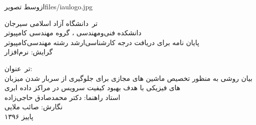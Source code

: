 
‌ازوسط
‌تصویر{files/iaulogo.jpg}


‌تر{\
	دانشگاه آزاد اسلامی سیرجان\\
دانشکده فنی‌ومهندسی ، گروه مهندسی کامپیوتر  \\
پایان نامه برای دریافت درجه کارشناسی‌ارشد رشته مهندسی‌کامپیوتر\
\\
گرایش: نرم‌افزار }


‌تر{\
	عنوان:\\
	بیان روشی به منظور تخصیص ماشین های مجازی برای جلوگیری از سربار شدن میزبان های فیزیکی با هدف بهبود کیفیت سرویس در مراکز داده ابری \\
	استاد راهنما: دکتر محمدصادق حاجی‌زاده \\
	نگارش: صائب ملایی \\
	پاییز   ۱۳۹۶
}

